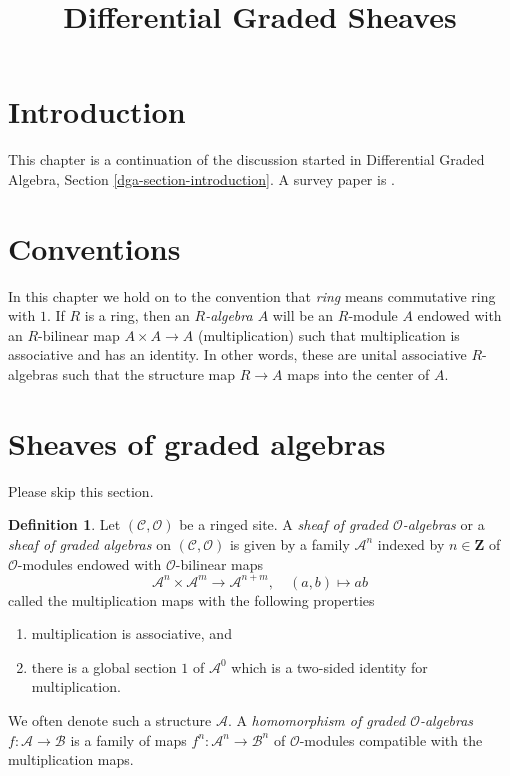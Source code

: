 \documentclass{stacks-project}
\theoremstyle{plain}
\theoremstyle{definition}
\newtheorem{definition}[subsection]{Definition}
\theoremstyle{remark}
\numberwithin{equation}{subsection}
\begin{document}
\title{Differential Graded Sheaves}


\maketitle

\label{section-phantom}

\tableofcontents

\section{Introduction}
\label{section-introduction}

\noindent
This chapter is a continuation of the discussion started in
Differential Graded Algebra, Section \ref{dga-section-introduction}.
A survey paper is \cite{Keller-survey}.




\section{Conventions}
\label{section-conventions}

\noindent
In this chapter we hold on to the convention that {\it ring} means
commutative ring with $1$. If $R$ is a ring, then an {\it $R$-algebra $A$}
will be an $R$-module $A$ endowed with an $R$-bilinear map $A \times A \to A$
(multiplication) such that multiplication is associative and has an
identity.
In other words, these are unital associative $R$-algebras
such that the structure map $R \to A$ maps into the center of $A$.








\section{Sheaves of graded algebras}
\label{section-ga}

\noindent
Please skip this section.

\begin{definition}
\label{definition-ga}
Let $(\mathcal{C}, \mathcal{O})$ be a ringed site. A
{\it sheaf of graded $\mathcal{O}$-algebras}
or a {\it sheaf of graded algebras} on $(\mathcal{C}, \mathcal{O})$
is given by a family $\mathcal{A}^n$ indexed by $n \in \mathbf{Z}$
of $\mathcal{O}$-modules endowed with $\mathcal{O}$-bilinear maps
$$
\mathcal{A}^n \times \mathcal{A}^m \to \mathcal{A}^{n + m},\quad
(a, b) \longmapsto ab
$$
called the multiplication maps with the following properties
\begin{enumerate}
\item multiplication is associative, and
\item there is a global section $1$ of $\mathcal{A}^0$
which is a two-sided identity for multiplication.
\end{enumerate}
We often denote such a structure $\mathcal{A}$.
A {\it homomorphism of graded $\mathcal{O}$-algebras}
$f : \mathcal{A} \to \mathcal{B}$ is a family of maps
$f^n : \mathcal{A}^n \to \mathcal{B}^n$
of $\mathcal{O}$-modules compatible with the multiplication maps.
\end{definition}
\end{document}

